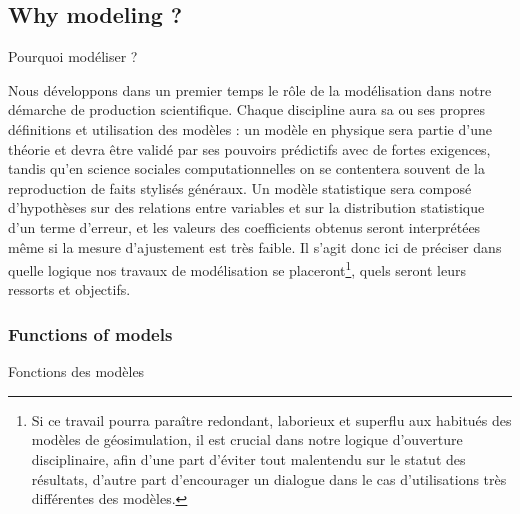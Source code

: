\subsection{Why modeling ?}{Pourquoi modéliser ?}


Nous développons dans un premier temps le rôle de la modélisation dans notre démarche de production scientifique. Chaque discipline aura sa ou ses propres définitions et utilisation des modèles : un modèle en physique sera partie d'une théorie et devra être validé par ses pouvoirs prédictifs avec de fortes exigences, tandis qu'en science sociales computationnelles on se contentera souvent de la reproduction de faits stylisés généraux. Un modèle statistique sera composé d'hypothèses sur des relations entre variables et sur la distribution statistique d'un terme d'erreur, et les valeurs des coefficients obtenus seront interprétées même si la mesure d'ajustement est très faible. Il s'agit donc ici de préciser dans quelle logique nos travaux de modélisation se placeront\footnote{Si ce travail pourra paraître redondant, laborieux et superflu aux habitués des modèles de géosimulation, il est crucial dans notre logique d'ouverture disciplinaire, afin d'une part d'éviter tout malentendu sur le statut des résultats, d'autre part d'encourager un dialogue dans le cas d'utilisations très différentes des modèles.}, quels seront leurs ressorts et objectifs.


\subsubsection{Functions of models}{Fonctions des modèles}


